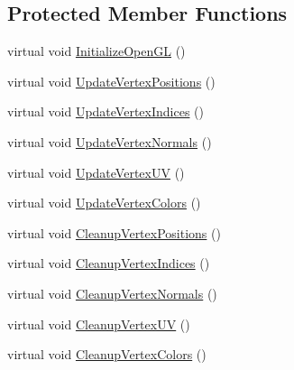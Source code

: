 \subsection*{Protected Member Functions}
\begin{DoxyCompactItemize}
\item 
virtual void \hyperlink{class_rendering_object_a77c78d1b42ea2ebfdbf994b6b91ce805}{Initialize\+Open\+G\+L} ()
\item 
virtual void \hyperlink{class_rendering_object_a7a097727acf37f9671ddd5e3a9873771}{Update\+Vertex\+Positions} ()
\item 
virtual void \hyperlink{class_rendering_object_afb49054121b1b552bce58625db91b851}{Update\+Vertex\+Indices} ()
\item 
virtual void \hyperlink{class_rendering_object_ae4b537e1c9b1c5c50cb7b0db83e6f190}{Update\+Vertex\+Normals} ()
\item 
virtual void \hyperlink{class_rendering_object_ac00889f2afaa605b09164649ef68a1b6}{Update\+Vertex\+U\+V} ()
\item 
virtual void \hyperlink{class_rendering_object_aca18dbb9252f27cef09df307dbcf02a9}{Update\+Vertex\+Colors} ()
\item 
virtual void \hyperlink{class_rendering_object_af9c1a07398071cdd0cca3ad36095fc85}{Cleanup\+Vertex\+Positions} ()
\item 
virtual void \hyperlink{class_rendering_object_ac60c8a7f3d5678fd4aa8198f6c980e6e}{Cleanup\+Vertex\+Indices} ()
\item 
virtual void \hyperlink{class_rendering_object_ad89bc24893f8fe32794f0686c2bb0da1}{Cleanup\+Vertex\+Normals} ()
\item 
virtual void \hyperlink{class_rendering_object_a776f54b41f9e9f0e55fc1104919c3e7c}{Cleanup\+Vertex\+U\+V} ()
\item 
virtual void \hyperlink{class_rendering_object_adce4a6d6406eb589b088bedd19127f32}{Cleanup\+Vertex\+Colors} ()
\end{DoxyCompactItemize}
